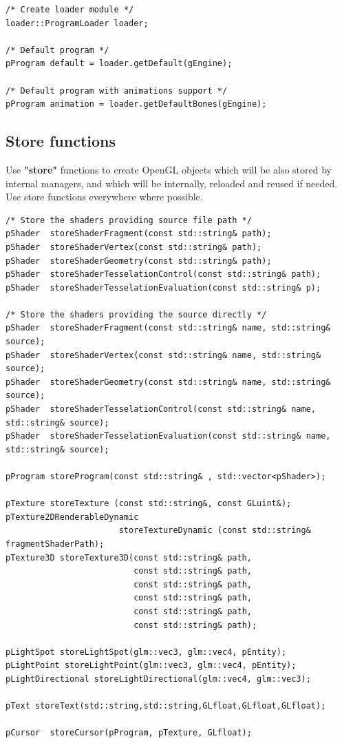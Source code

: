 \documentclass{article}
\begin{document}
\begin{lstlisting}
/* Create loader module */
loader::ProgramLoader loader;

/* Default program */
pProgram default = loader.getDefault(gEngine);

/* Default program with animations support */
pProgram animation = loader.getDefaultBones(gEngine);
\end{lstlisting}

\newpage

\subsection{Store functions}\label{sec:store functions}
\indent \indent Use \textbf{"store"} functions to create OpenGL objects which will be also stored by internal managers, and which will be internally, reloaded and reused if needed. Use store functions everywhere where possible.

\begin{lstlisting}
/* Store the shaders providing source file path */
pShader  storeShaderFragment(const std::string& path);
pShader  storeShaderVertex(const std::string& path);
pShader  storeShaderGeometry(const std::string& path);
pShader  storeShaderTesselationControl(const std::string& path);
pShader  storeShaderTesselationEvaluation(const std::string& p);

/* Store the shaders providing the source directly */
pShader  storeShaderFragment(const std::string& name, std::string& source);
pShader  storeShaderVertex(const std::string& name, std::string& source);
pShader  storeShaderGeometry(const std::string& name, std::string& source);
pShader  storeShaderTesselationControl(const std::string& name, std::string& source);
pShader  storeShaderTesselationEvaluation(const std::string& name, std::string& source);

pProgram storeProgram(const std::string& , std::vector<pShader>);

pTexture storeTexture (const std::string&, const GLuint&);
pTexture2DRenderableDynamic 
                       storeTextureDynamic (const std::string& fragmentShaderPath);
pTexture3D storeTexture3D(const std::string& path,
                          const std::string& path,
                          const std::string& path,
                          const std::string& path,
                          const std::string& path,
                          const std::string& path);

pLightSpot storeLightSpot(glm::vec3, glm::vec4, pEntity);
pLightPoint storeLightPoint(glm::vec3, glm::vec4, pEntity);
pLightDirectional storeLightDirectional(glm::vec4, glm::vec3);

pText storeText(std::string,std::string,GLfloat,GLfloat,GLfloat);

pCursor  storeCursor(pProgram, pTexture, GLfloat);
\end{lstlisting}
\end{document}
